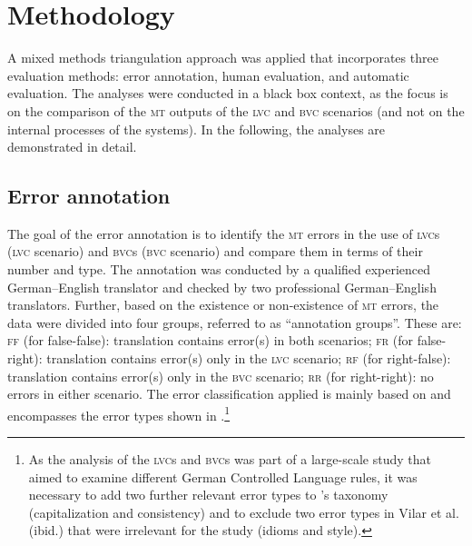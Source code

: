 \documentclass[output=paper]{langsci/langscibook}
\begin{document}
\section{Methodology}\label{marzouk:meth}

A mixed methods triangulation approach was applied that incorporates three evaluation methods: error annotation, human evaluation, and automatic evaluation. The analyses were conducted in a black box context, as the focus is on the comparison of the \textsc{mt} outputs of the \textsc{lvc} and \textsc{bvc} scenarios (and not on the internal processes of the systems). In the following, the analyses are demonstrated in detail.

\subsection{Error annotation}

The goal of the error annotation is to identify the \textsc{mt} errors in the use of \textsc{lvc}s (\textsc{lvc} scenario) and \textsc{bvc}s (\textsc{bvc} scenario) and compare them in terms of their number and type. The annotation was conducted by a qualified experienced German–English translator and checked by two professional German–English translators. Further, based on the existence or non-existence of \textsc{mt} errors, the data were divided into four groups, referred to as ``annotation groups''. These are: \textsc{ff} (for false-false): translation contains error(s) in both scenarios; \textsc{fr} (for false-right): translation contains error(s) only in the \textsc{lvc} scenario; \textsc{rf} (for right-false): translation contains error(s) only in the \textsc{bvc} scenario; \textsc{rr} (for right-right): no errors in either scenario. The error classification applied is mainly based on \citet{Vilar2006} and encompasses the error types shown in .\footnote{As the analysis of the \textsc{lvc}s and \textsc{bvc}s was part of a large-scale study that aimed to examine different German Controlled Language rules, it was necessary to add two further relevant error types to \citet{Vilar2006}'s taxonomy (capitalization and consistency) and to exclude two error types in Vilar et al. (ibid.) that were irrelevant for the study (idioms and style).}
\end{document}
